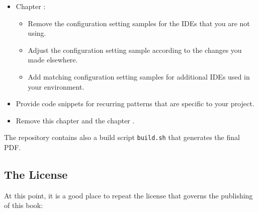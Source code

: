 \begin{itemize}
	\item{Chapter :
	    \begin{itemize}
		    \item{Remove the configuration setting samples for the IDEs that you are not using.}
		    \item{Adjust the configuration setting sample according to the changes you made elsewhere.}
		    \item{Add matching configuration setting samples for additional IDEs used in your environment.}
	    \end{itemize}}
	
	\item{Provide code snippets for recurring patterns that are specific to your project.}
	
	\item{Remove this chapter  and the chapter .}

\end{itemize}

The repository contains also a build script \verb#build.sh# that generates the final PDF.

\subsection*{The License}
At this point, it is a good place to repeat the license that governs the publishing of this book:



